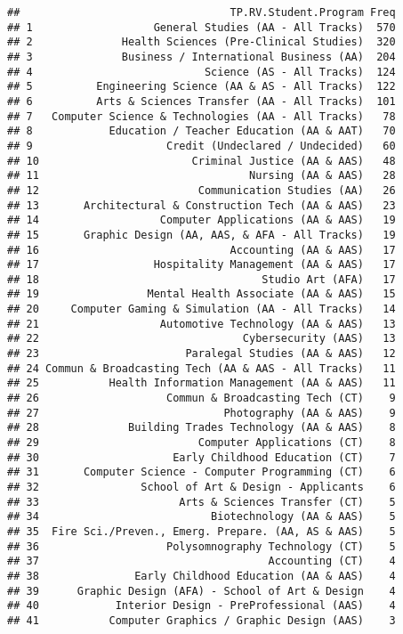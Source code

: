 \documentclass[]{article}
\begin{document}
\begin{verbatim}
##                                 TP.RV.Student.Program Freq
## 1                   General Studies (AA - All Tracks)  570
## 2              Health Sciences (Pre-Clinical Studies)  320
## 3              Business / International Business (AA)  204
## 4                           Science (AS - All Tracks)  124
## 5          Engineering Science (AA & AS - All Tracks)  122
## 6          Arts & Sciences Transfer (AA - All Tracks)  101
## 7   Computer Science & Technologies (AA - All Tracks)   78
## 8            Education / Teacher Education (AA & AAT)   70
## 9                     Credit (Undeclared / Undecided)   60
## 10                        Criminal Justice (AA & AAS)   48
## 11                                 Nursing (AA & AAS)   28
## 12                         Communication Studies (AA)   26
## 13       Architectural & Construction Tech (AA & AAS)   23
## 14                   Computer Applications (AA & AAS)   19
## 15       Graphic Design (AA, AAS, & AFA - All Tracks)   19
## 16                              Accounting (AA & AAS)   17
## 17                  Hospitality Management (AA & AAS)   17
## 18                                   Studio Art (AFA)   17
## 19                 Mental Health Associate (AA & AAS)   15
## 20     Computer Gaming & Simulation (AA - All Tracks)   14
## 21                   Automotive Technology (AA & AAS)   13
## 22                                Cybersecurity (AAS)   13
## 23                       Paralegal Studies (AA & AAS)   12
## 24 Commun & Broadcasting Tech (AA & AAS - All Tracks)   11
## 25           Health Information Management (AA & AAS)   11
## 26                    Commun & Broadcasting Tech (CT)    9
## 27                             Photography (AA & AAS)    9
## 28              Building Trades Technology (AA & AAS)    8
## 29                         Computer Applications (CT)    8
## 30                     Early Childhood Education (CT)    7
## 31       Computer Science - Computer Programming (CT)    6
## 32                School of Art & Design - Applicants    6
## 33                      Arts & Sciences Transfer (CT)    5
## 34                           Biotechnology (AA & AAS)    5
## 35  Fire Sci./Preven., Emerg. Prepare. (AA, AS & AAS)    5
## 36                    Polysomnography Technology (CT)    5
## 37                                    Accounting (CT)    4
## 38               Early Childhood Education (AA & AAS)    4
## 39      Graphic Design (AFA) - School of Art & Design    4
## 40            Interior Design - PreProfessional (AAS)    4
## 41           Computer Graphics / Graphic Design (AAS)    3

\end{verbatim}
\end{document}
